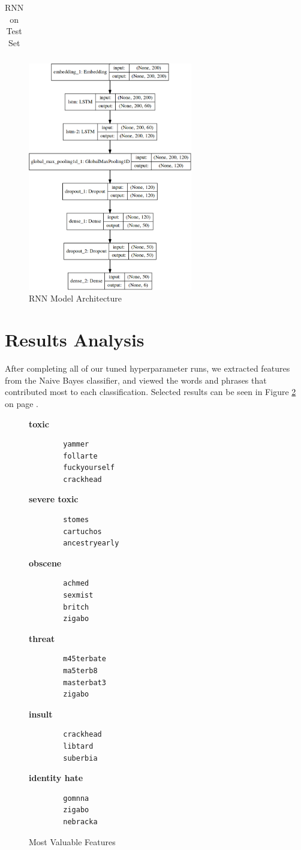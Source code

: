 \documentclass{article}
\begin{document}
{{\begin{table}[h!]
\begin{tabular}{|c|| c c c c|}
			  \hline
		  \end{tabular}
		  \caption{RNN on Test Set}
		  \label{table:rnn-test}
	  \end{table}

	  \begin{figure}[h]
		  \centering
		  \includegraphics[height=10cm]{model-architecture.png}
		  \caption{RNN Model Architecture}
		  \label{fig:model-arch}
	  \end{figure}
  }
 }

\section{Results Analysis}{
  After completing all of our tuned hyperparameter runs, we extracted features
  from the Naive Bayes classifier, and viewed the words and phrases that
  contributed most to each classification. Selected results can be seen in
  Figure \ref{fig:features} on page \pageref{fig:features}.

  \begin{figure}
	  \textbf{toxic}
	  \begin{verbatim}
		yammer
		follarte
		fuckyourself
		crackhead
	\end{verbatim}
	  \textbf{severe toxic}
	  \begin{verbatim}
		stomes
		cartuchos
		ancestryearly
	\end{verbatim}
	  \textbf{obscene}
	  \begin{verbatim}
		achmed
		sexmist
		britch
		zigabo
	\end{verbatim}
	  \textbf{threat}
	  \begin{verbatim}
		m45terbate
		ma5terb8
		masterbat3
		zigabo
	\end{verbatim}
	  \textbf{insult}
	  \begin{verbatim}
		crackhead
		libtard
		suberbia
	\end{verbatim}
	  \textbf{identity hate}
	  \begin{verbatim}
		gomnna
		zigabo
		nebracka
	\end{verbatim}
	  \caption{Most Valuable Features}
	  \label{fig:features}
  \end{figure}

 }
\end{document}
